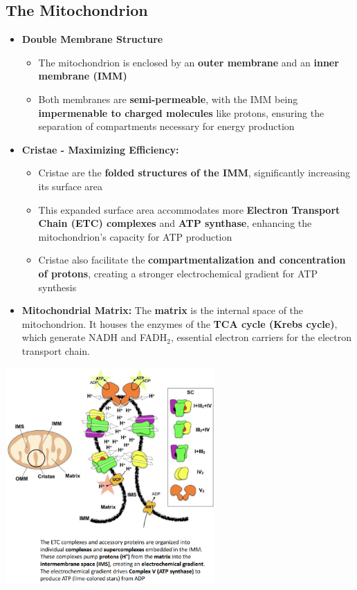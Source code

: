 \documentclass[10pt]{article}
\begin{document}
\subsection*{The Mitochondrion}
\begin{itemize}
	\item \textbf{Double Membrane Structure}
	\begin{itemize}
        \item The mitochondrion is enclosed by an \textbf{outer membrane} and an \textbf{inner membrane (IMM)}
        \item Both membranes are \textbf{semi-permeable}, with the IMM being \textbf{impermenable to charged molecules} like protons, ensuring the separation of compartments necessary for energy production
    \end{itemize}
	\item \textbf{Cristae - Maximizing Efficiency:}
	\begin{itemize}
        \item Cristae are the \textbf{folded structures of the IMM}, significantly increasing its surface area
        \item This expanded surface area accommodates more \textbf{Electron Transport Chain (ETC) complexes} and \textbf{ATP synthase}, enhancing the mitochondrion's capacity for ATP production
        \item Cristae also facilitate the \textbf{compartmentalization and concentration of protons}, creating a stronger electrochemical gradient for ATP synthesis
    \end{itemize}
	\item \textbf{Mitochondrial Matrix:}  The \textbf{matrix} is the internal space of the mitochondrion.  It houses the enzymes of the \textbf{TCA cycle (Krebs cycle)}, which generate NADH and FADH$_2$, essential electron carriers for the electron transport chain.
\end{itemize}
\begin{center} 
	\includegraphics*[width=0.6\textwidth]{L3_7.png}
\end{center}
\end{document}
